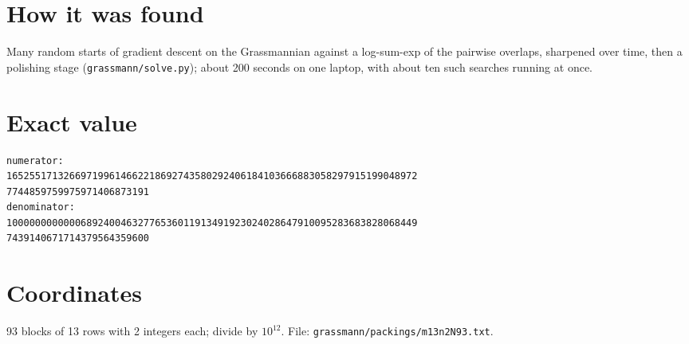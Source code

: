 \documentclass[11pt,a4paper]{article}
\begin{document}
\section{How it was found}
Many random starts of gradient descent on the Grassmannian against a log-sum-exp of the pairwise overlaps, sharpened over time, then a polishing stage (\texttt{grassmann/solve.py}); about 200 seconds on one laptop, with about ten such searches running at once.


\appendix
\section{Exact value}
{\small
\begin{verbatim}
numerator:
165255171326697199614662218692743580292406184103666883058297915199048972
7744859759975971406873191
denominator:
100000000000068924004632776536011913491923024028647910095283683828068449
7439140671714379564359600
\end{verbatim}}

\section{Coordinates}
93 blocks of 13 rows with 2 integers each; divide by $10^{12}$. File: \texttt{grassmann/packings/m13n2N93.txt}.
{\tiny
\begin{multicols}{4}
\end{multicols}}
\end{document}
